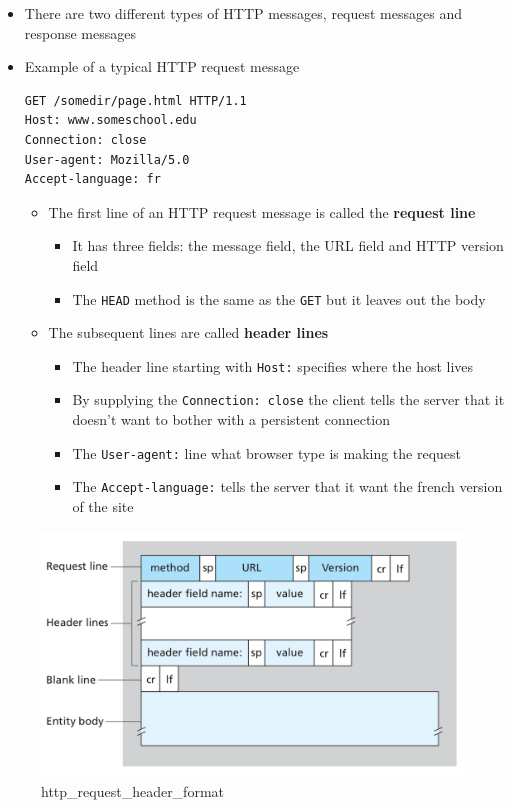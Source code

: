 \documentclass[11pt]{article}
\makeatletter
\def\maxwidth{\ifdim\Gin@nat@width>\linewidth\linewidth
    \else\Gin@nat@width\fi}
\let\Oldincludegraphics\includegraphics
\renewcommand{\includegraphics}[1]{\Oldincludegraphics[width=.8\maxwidth]{#1}}
\providecommand{\tightlist}{%
      \setlength{\itemsep}{0pt}\setlength{\parskip}{0pt}}
\makeatother
\begin{document}
\begin{itemize}
\item
  There are two different types of HTTP messages, request messages and
  response messages
\item
  Example of a typical HTTP request message

\begin{verbatim}
GET /somedir/page.html HTTP/1.1
Host: www.someschool.edu
Connection: close
User-agent: Mozilla/5.0
Accept-language: fr
\end{verbatim}

  \begin{itemize}
  \tightlist
  \item
    The first line of an HTTP request message is called the
    \textbf{request line}

    \begin{itemize}
    \tightlist
    \item
      It has three fields: the message field, the URL field and HTTP
      version field
    \item
      The \texttt{HEAD} method is the same as the \texttt{GET} but it
      leaves out the body
    \end{itemize}
  \item
    The subsequent lines are called \textbf{header lines}

    \begin{itemize}
    \tightlist
    \item
      The header line starting with \texttt{Host:} specifies where the
      host lives
    \item
      By supplying the \texttt{Connection:\ close} the client tells the
      server that it doesn't want to bother with a persistent connection
    \item
      The \texttt{User-agent:} line what browser type is making the
      request
    \item
      The \texttt{Accept-language:} tells the server that it want the
      french version of the site
    \end{itemize}
  \end{itemize}
\end{itemize}

\begin{figure}
\centering
\includegraphics{img/http_request_header_format.png}
\caption{http\_request\_header\_format}
\end{figure}
\end{document}
